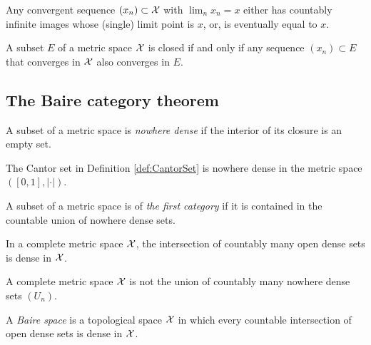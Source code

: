 \begin{lem}
  \label{lem:converge2cases}
  Any convergent sequence $(x_n)\subset{\cal X}$ with $\lim_n x_n =x$
  either has countably infinite images whose (single) limit point is
  $x$, 
  or, is eventually equal to $x$.
\end{lem}

\begin{lem}
  \label{lem:closedSetConvergence}
  A subset $E$ of a metric space ${\cal X}$ is closed
  if and only if any sequence $(x_n)\subset E$
  that converges in ${\cal X}$ also converges in $E$.
\end{lem}

\subsection{The Baire category theorem}

\begin{defn}
  \label{def:nowhereDense}
  A subset of a metric space is \emph{nowhere dense}
  if the interior of its closure is an empty set.
\end{defn}

\begin{exm}
  The Cantor set in Definition \ref{def:CantorSet}
  is nowhere dense in the metric space $([0,1],|\cdot|)$.
\end{exm}

\begin{defn}
  \label{def:metricSpaceFirstCat}
  A subset of a metric space is of \emph{the first category}
  if it is contained in the countable union of nowhere dense sets.
\end{defn}

\begin{thm}
  \label{thm:BaireCat}
  In a complete metric space ${\cal X}$,
  the intersection of countably many open dense sets is dense in ${\cal X}$.
\end{thm}

\begin{coro}
  \label{coro:BaireCat}
  A complete metric space ${\cal X}$ is 
  not the union of countably many nowhere dense sets $(U_n)$.
\end{coro}

\begin{defn}
  A \emph{Baire space} is a topological space ${\cal X}$
  in which every countable intersection of open dense sets
  is dense in ${\cal X}$.
\end{defn}

